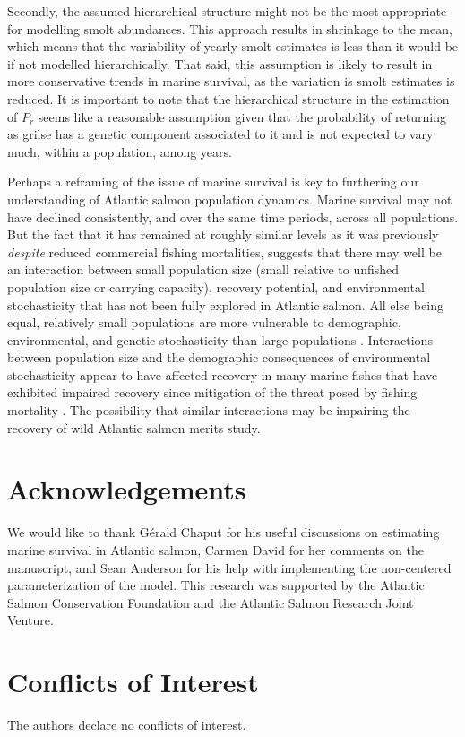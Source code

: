\documentclass[12pt]{article}
\newcommand{\Pg}{$P_r$\xspace}
\begin{document}
Secondly, the assumed hierarchical structure might not be the most appropriate
for modelling smolt abundances. This approach results in shrinkage to the
mean, which means that the variability of yearly smolt estimates is less than
it would be if not modelled hierarchically. 
That said, this assumption is likely to result in more conservative trends in marine survival, as the
variation is smolt estimates is reduced.
It is important to note that the hierarchical structure in the estimation of
\Pg seems like a reasonable assumption given that the probability of returning
as grilse has a genetic component associated to it \citep{Aykanat2019} and is
not expected to vary much, within a population, among years.

Perhaps a reframing of the issue of marine survival is key to furthering our
understanding of Atlantic salmon population dynamics. Marine survival may not
have declined consistently, and over the same time periods, across all
populations. 
But the fact that it has remained at roughly similar levels as it was
previously \emph{despite} reduced commercial fishing mortalities, suggests
that there may well be an interaction between small population size (small
relative to unfished population size or carrying capacity), recovery
potential, and environmental stochasticity that has not been fully explored in
Atlantic salmon. 
All else being equal, relatively small populations are more vulnerable to
demographic, environmental, and genetic stochasticity than large populations
\citep{Lande1993, Hutchings2015}. Interactions between population size and the
demographic consequences of environmental stochasticity appear to have
affected recovery in many marine fishes that have exhibited impaired recovery
since mitigation of the threat posed by fishing mortality
\citep{Hutchings2017, Hutchings2020}. The possibility that similar
interactions may be impairing the recovery of wild Atlantic salmon merits
study.

\section*{Acknowledgements}

We would like to thank G\'{e}rald Chaput for his useful discussions on
estimating marine survival in Atlantic salmon, Carmen David for her comments
on the manuscript, and Sean Anderson for his help with implementing the
non-centered parameterization of the model. This research was supported by the
Atlantic Salmon Conservation Foundation and the Atlantic Salmon Research Joint
Venture.

\section*{Conflicts of Interest}

The authors declare no conflicts of interest.
 


%
\end{document}
